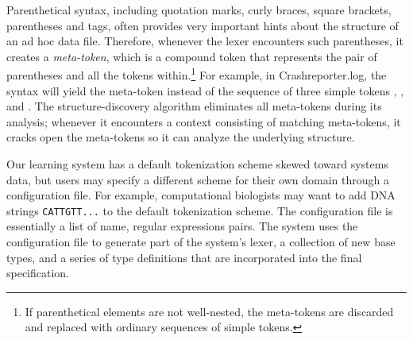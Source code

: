 Parenthetical syntax, including quotation marks, curly braces, square brackets,
parentheses and \xml{} tags,
often provides very important hints about the structure
of an ad hoc data file.  Therefore, whenever the lexer encounters 
such parentheses, it creates a {\em meta-token}, which is a compound
token that 
represents the pair of parentheses and all the tokens 
within.\footnote{If parenthetical elements
are not well-nested, the meta-tokens are discarded and replaced with
ordinary sequences of simple tokens.}  For example, in Crashreporter.log,
the syntax \cd{[2164]} will yield the meta-token \cd{[*]} instead of
the sequence of three simple tokens \cd{[}, , and \cd{]}.  
The structure-discovery algorithm eliminates all meta-tokens during
its analysis; whenever it encounters a context consisting of
matching meta-tokens, it cracks open the meta-tokens so it can analyze
the underlying structure.

Our learning system has a default tokenization scheme skewed toward systems
data, but users may specify a different scheme for their own domain
through a configuration file.  For example, computational biologists
may want to add DNA strings {\tt CATTGTT...} to the default tokenization 
scheme.  The configuration file is essentially
a list of name, regular expressions pairs.  The system uses the configuration
file to generate part of the system's lexer, a
collection of new \ir{} base types, and a series of type 
definitions that are incorporated into the final \pads{} specification.  





